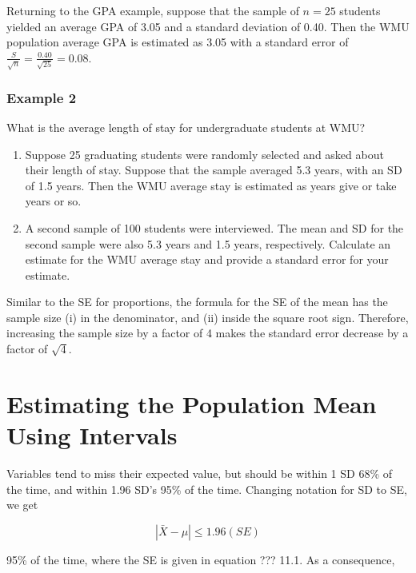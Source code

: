 \documentclass[11pt, chapterprefix=true]{scrbook}\usepackage[]{graphicx}\usepackage[]{color}
\begin{document}
Returning to the GPA example, suppose that the sample of $n = 25$ students yielded an average GPA of 3.05 and a standard deviation of 0.40.  Then the WMU population average GPA is estimated as 3.05 with a standard error of $\frac{S}{\sqrt{n}} = \frac{0.40}{\sqrt{25}} = 0.08$.

\subsubsection{Example 2}

What is the average length of stay for undergraduate students at WMU?

\begin{enumerate}
  \item Suppose 25 graduating students were randomly selected and asked about their length of stay.  Suppose that the sample averaged 5.3 years, with an SD of 1.5 years.  Then the WMU average stay is estimated as \underline{\phantom{xxxxxxxx}}  years give or take \underline{\phantom{xxxxxxxx}} years or so. 

  \item A second sample of 100 students were interviewed.   The mean and SD for the second sample were also 5.3 years and 1.5 years, respectively. Calculate an estimate for the WMU average stay and provide a standard error for your estimate.
\end{enumerate}

Similar to the SE for proportions, the formula for the SE of the mean has the sample size (i) in the denominator, and (ii) inside the square root sign.  Therefore, increasing the sample size by a factor of 4 makes the standard error decrease by a factor of $\sqrt{4}$. 


\section{Estimating the Population Mean Using Intervals}

Variables tend to miss their expected value, but should be within 1 SD 68\% of the time, and within 1.96 SD's 95\% of the time. Changing notation for SD to SE, we get

\begin{equation*}
| \bar{X} - \mu | \le 1.96 (SE) 
\end{equation*}

95\% of the time, where the SE is given in equation ??? 11.1.  As a consequence,
\end{document}
